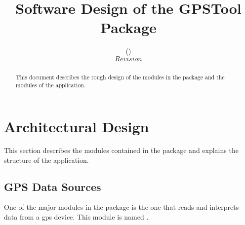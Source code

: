 \documentclass[a4paper]{article} %
\begin{document}
\begin{Form}\end{Form}

\title{Software Design of the GPSTool Package}                     %
\author{(\cdaller)\\                         %
  $Revision$}                      %


\maketitle

\vspace{1cm}

\begin{abstract}

This document describes the rough design of the modules in the
 package and the modules of the
 application.

\end{abstract}

\newpage

\tableofcontents

\newpage

\section{Architectural Design}
\label{SoftwareDesignOfTheGpstoolPackage-ArchitecturalDesign}

This section describes the modules contained in the
 package and explains the structure
of the  application.

\subsection{GPS Data Sources}
\label{SoftwareDesignOfTheGpstoolPackage-GpsDataSources}

One of the major modules in the 
package is the one that reads and interprets data from a gps
device. This module is named
.
\end{document}
